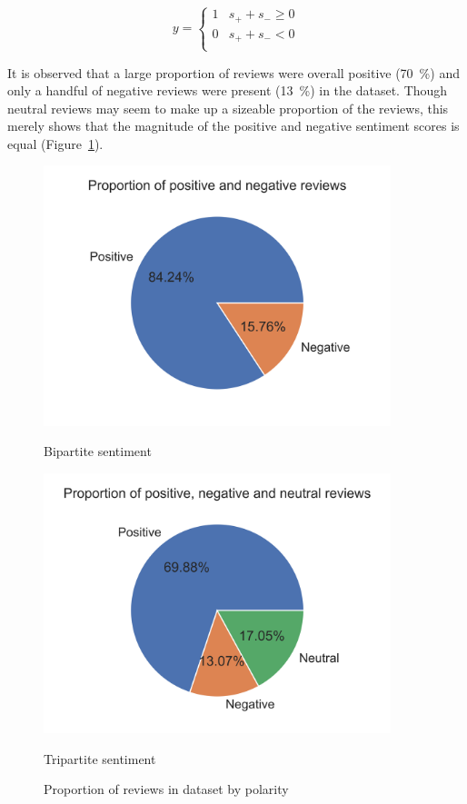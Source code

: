 \documentclass[11pt, a4paper]{pancake-article}
\begin{document}
\begin{equation}
	y = \begin{cases}
		1 & s_+ + s_- \geq 0 \\
		0 & s_+ + s_- < 0    \\
	\end{cases}
	\label{eq:polarity}
\end{equation}

It is observed that a large proportion of reviews were overall positive (\qty{70}{\percent})
and only a handful of negative reviews were present (\qty{13}{\percent}) in the dataset.
Though neutral reviews may seem to make up a sizeable proportion of the reviews, this merely
shows that the magnitude of the positive and negative sentiment scores is equal (Figure~\ref{fig:pies}).

\begin{figure}[htpb]
	\centering
	\begin{minipage}{0.5\textwidth}
		\centering
		\includegraphics[width=0.9\textwidth]{../results/old/pie_bipartite.png}
		\caption*{Bipartite sentiment}
	\end{minipage}\hfill
	\begin{minipage}{0.5\textwidth}
		\centering
		\includegraphics[width=0.9\textwidth]{../results/old/pie_tripartite.png}
		\caption*{Tripartite sentiment}
	\end{minipage}
	\caption{Proportion of reviews in dataset by polarity}
	\label{fig:pies}
\end{figure}
\end{document}
